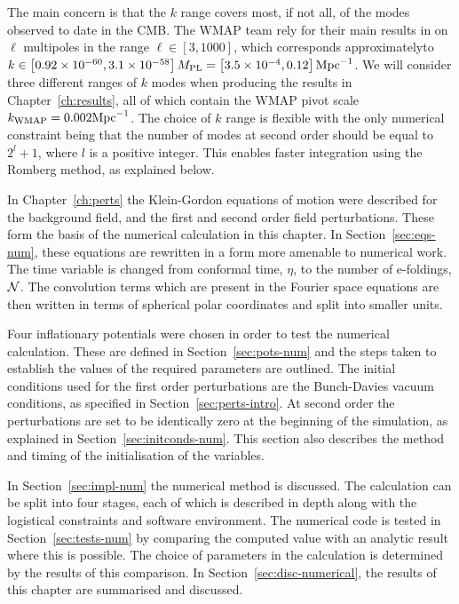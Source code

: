 The main concern is that the $k$ range covers most, if not all, of the modes observed
to date in the CMB. The WMAP team rely for their main results in 
 on $\ell$ multipoles in the range $\ell \in [3, 1000]$,
which corresponds approximately\footnotemark  to $k\in \left[0.92 \times 10^{-60}, 3.1 \times
10^{-58}\right]M_{\mathrm{PL}} = \left[3.5\times 10^{-4}, 0.12\right] \mathrm{Mpc}^{-1}$.
We will consider three different ranges of $k$ modes when producing the results in
Chapter~\ref{ch:results}, all of which contain the WMAP pivot scale
$k_\mathrm{WMAP}=0.002\mathrm{Mpc}^{-1}$. The
choice of $k$ range is flexible with the only numerical constraint being that the
number of modes at second order should be equal to $2^l +1$, where $l$ is a positive
integer. This enables
faster integration using the Romberg method, as explained below. 


In Chapter~\ref{ch:perts} the Klein-Gordon equations of motion were described for the
background field, and the first and second order field perturbations. These form the
basis of the numerical calculation in this chapter. In Section~\ref{sec:eqs-num},
these equations are rewritten in a form more amenable to numerical work. The time
variable is changed from conformal time, $\eta$, to the number of e-foldings, $\mathcal{N}$.
The convolution terms which are present in the Fourier space equations are then
written in terms of spherical polar coordinates and split into smaller units. 


Four inflationary potentials were chosen in order to test the numerical calculation.
These are defined in
Section~\ref{sec:pots-num} and the steps taken to establish the values of the
required parameters are outlined. The initial conditions used for the first order
perturbations are the Bunch-Davies vacuum conditions, as specified in
Section~\ref{sec:perts-intro}. At second order the perturbations are set to be
identically zero at the beginning of the simulation, as explained in
Section~\ref{sec:initconds-num}. This section also describes the method and timing of
the initialisation of the variables.


In Section~\ref{sec:impl-num} the numerical method is discussed. The calculation can
be split into four stages, each of which is described in depth along with the
logistical constraints and software environment. The numerical code is tested in
Section~\ref{sec:tests-num} by comparing the computed value with an analytic result
where this is possible. The choice of parameters in the calculation is determined by
the results of this comparison. In Section~\ref{sec:disc-numerical}, the results of
this chapter are summarised and discussed.


